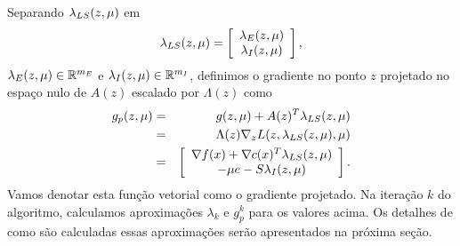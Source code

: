 Separando $\lambda_{LS}(z,\mu)$ em 
$$\lambda_{LS}(z,\mu) = \left[\begin{array}{c}\lambda_E(z,\mu) \\ \lambda_I(z,\mu)\end{array}\right],$$ 
$\lambda_E(z,\mu) \in \mathbb{R}^{m_E}$ e $\lambda_I(z,\mu) \in \mathbb{R}^{m_I}$,
definimos o gradiente no ponto $z$ projetado no espaço nulo de $A(z)$ escalado
por $\Lambda(z)$ como
\begin{eqnarray}\visiblelbl{gradproj}
 g_p(z,\mu) 
& = & g(z,\mu) + A(z)^T\lambda_{LS}(z,\mu) \\
& = & \Lambda(z) \nabla_zL(z,\lambda_{LS}(z,\mu),\mu) \nonumber \\
& = & \vetor{\nabla f(x) + \nabla c(x)^T \lls(z,\mu)}
 {-\mu e - S\lambda_I(z,\mu)} \visiblelbl{gradproj.vetor}.
\end{eqnarray}
Vamos denotar esta função vetorial como o gradiente projetado.
Na iteração $k$ do algoritmo, calculamos aproximações $\lambda_k$ e $g_p^k$ para
os valores acima. Os detalhes de como são calculadas essas aproximações serão
apresentados na próxima seção.



